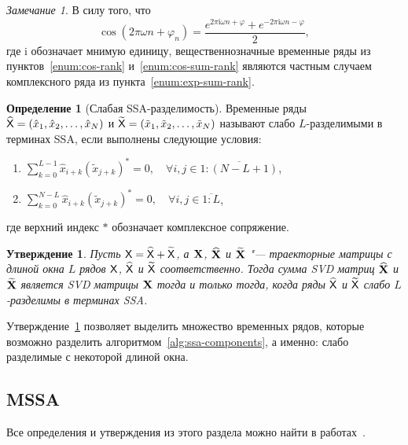 \documentclass[specialist,
  substylefile=spbu_report.rtx,
subf,href,colorlinks=true, 12pt]{disser}
\theoremstyle{plain}
\newtheorem{statement}{Утверждение}[section]
\theoremstyle{definition}
\newtheorem{definition}{Определение}[section]
\theoremstyle{remark}
\newtheorem{remark}{Замечание}[section]
\newcommand{\iu}{\mathrm{i}}
\begin{document}
\begin{remark}\label{remark:cos-exp}
  В силу того, что
  \[
    \cos(2 \pi \omega n + \varphi_n) =
    \frac{e^{2\pi \iu \omega n + \varphi} + e^{-2\pi \iu \omega n -
    \varphi}}{2},
  \]
  где $\iu$ обозначает мнимую единицу,
  вещественнозначные временные ряды из
  пунктов~\ref{enum:cos-rank} и~\ref{enum:cos-sum-rank} являются
  частным случаем комплексного ряда из пункта~\ref{enum:exp-sum-rank}.
\end{remark}

\begin{definition}[Слабая SSA-разделимость]
  \label{def:ssa-separability}
  Временные ряды $\widehat{\mathsf{X}} = (\hat{x}_1, \hat{x}_2, \ldots, \hat{x}_N)$ и
  $\widetilde{\mathsf{X}} = (\tilde{x}_1, \tilde{x}_2, \ldots, \tilde{x}_N)$
  называют слабо $L$-разделимыми в терминах
  SSA, если выполнены следующие условия:
  \begin{enumerate}
    \item $\displaystyle \sum_{k=0}^{L - 1} \hat{x}_{i +
      k}\left(\tilde{x}_{j + k}\right)^* = 0,
      \quad \forall i, j \in \overline{1:(N - L + 1)}$,
    \item $\displaystyle \sum_{k=0}^{N - L}\hat{x}_{i +
      k}\left(\tilde{x}_{j + k}\right)^* = 0,
      \quad \forall i, j \in \overline{1:L}$,
  \end{enumerate}
  где верхний индекс $*$ обозначает комплексное сопряжение.
\end{definition}

\begin{statement}
  \label{state:ssa-separability}
  Пусть $\mathsf{X} = \widehat{\mathsf{X}} + \widetilde{\mathsf{X}}$, а $\mathbf{X}$,
  $\widehat{\mathbf{X}}$ и $\widetilde{\mathbf{X}}$ "--- траекторные
  матрицы с длиной окна $L$ рядов $\mathsf{X}$, $\widehat{\mathsf{X}}$ и
  $\widetilde{\mathsf{X}}$ соответственно.
  Тогда сумма \emph{SVD} матриц $\widehat{\mathbf{X}}$ и $\widetilde{\mathbf{X}}$
  является \emph{SVD} матрицы $\mathbf{X}$ тогда и только тогда, когда
  ряды $\widehat{\mathsf{X}}$ и $\widetilde{\mathsf{X}}$ слабо $L$-разделимы в
  терминах \emph{SSA}.
\end{statement}

Утверждение~\ref{state:ssa-separability} позволяет выделить множество
временных рядов, которые возможно
разделить алгоритмом~\ref{alg:ssa-components}, а именно: слабо
разделимые с некоторой длиной окна.

\subsection{MSSA}\label{subsec:mssa}
Все определения и утверждения из этого раздела можно найти в
работах~\cite{mssa, mssa2, ssa-2020}.
\end{document}
